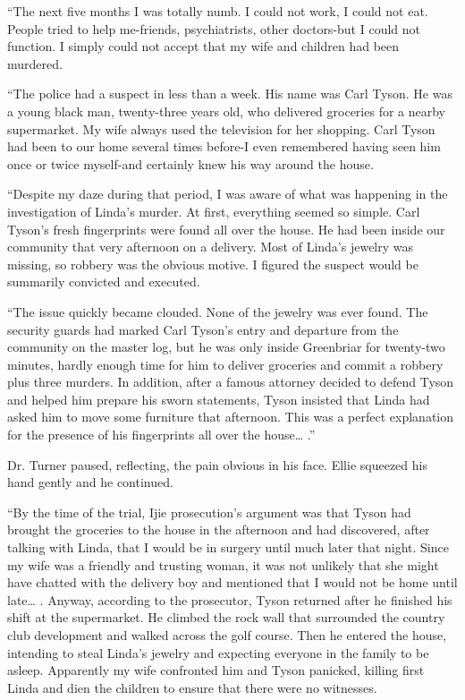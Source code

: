 \documentclass[]{article}
\begin{document}
{“The next five months I was totally numb. I could not work, I could not eat. People tried to help me-friends, psychiatrists, other doctors-but I could not function. I simply could not accept that my wife and children had been murdered.

“The police had a suspect in less than a week. His name was Carl Tyson. He was a young black man, twenty-three years old, who delivered groceries for a nearby supermarket. My wife always used the television for her shopping. Carl Tyson had been to our home several times before-I even remembered having seen him once or twice myself-and certainly knew his way around the house.

“Despite my daze during that period, I was aware of what was happening in the investigation of Linda’s murder. At first, everything seemed so simple. Carl Tyson’s fresh fingerprints were found all over the house. He had been inside our community that very afternoon on a delivery. Most of Linda’s jewelry was missing, so robbery was the obvious motive. I figured the suspect would be summarily convicted and executed.

“The issue quickly became clouded. None of the jewelry was ever found. The security guards had marked Carl Tyson’s entry and departure from the community on the master log, but he was only inside Greenbriar for twenty-two minutes, hardly enough time for him to deliver groceries and commit a robbery plus three murders. In addition, after a famous attorney decided to defend Tyson and helped him prepare his sworn statements, Tyson insisted that Linda had asked him to move some furniture that afternoon. This was a perfect explanation for the presence of his fingerprints all over the house… .”

Dr. Turner paused, reflecting, the pain obvious in his face. Ellie squeezed his hand gently and he continued.

“By the time of the trial, Ijie prosecution’s argument was that Tyson had brought the groceries to the house in the afternoon and had discovered, after talking with Linda, that I would be in surgery until much later that night. Since my wife was a friendly and trusting woman, it was not unlikely that she might have chatted with the delivery boy and mentioned that I would not be home until late… . Anyway, according to the prosecutor, Tyson returned after he finished his shift at the supermarket. He climbed the rock wall that surrounded the country club development and walked across the golf course. Then he entered the house, intending to steal Linda’s jewelry and expecting everyone in the family to be asleep. Apparently my wife confronted him and Tyson panicked, killing first Linda and dien the children to ensure that there were no witnesses.

}
\end{document}
